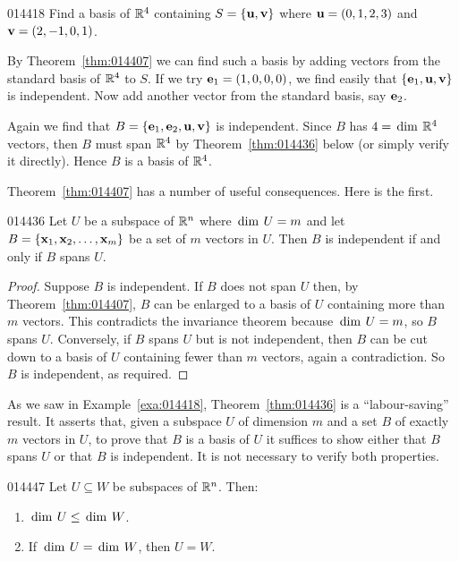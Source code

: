 \begin{example}{}{014418}
Find a basis of $\mathbb{R}^4$ containing $S = \{\textbf{u}, \textbf{v}\}$ where $\textbf{u} = (0, 1, 2, 3)$ and $\textbf{v} = (2, -1, 0, 1)$.

\begin{solution}
By Theorem~\ref{thm:014407} we can find such a basis by adding vectors from the standard basis of $\mathbb{R}^4$ to $S$. If we try $\textbf{e}_{1} = (1, 0, 0, 0)$, we find easily that $\{\textbf{e}_{1}, \textbf{u}, \textbf{v}\}$ is independent. Now add another vector from the standard basis, say $\textbf{e}_{2}$.

Again we find that $B = \{\textbf{e}_{1}, \textbf{e}_{2}, \textbf{u}, \textbf{v}\}$ is independent. Since $B$ has $4 = \thinspace\operatorname{dim\medspace} \mathbb{R}^4$ vectors, then $B$ must span $\mathbb{R}^4$ by Theorem~\ref{thm:014436} below (or simply verify it directly). Hence $B$ is a basis of $\mathbb{R}^4$.
\end{solution}
\end{example}

\noindent Theorem~\ref{thm:014407} has a number of useful consequences. Here is the first.

\begin{theorem}{}{014436} %
Let $U$ be a subspace of $\mathbb{R}^n$ where $\thinspace\operatorname{dim\medspace} U = m$ and let $B = \{\textbf{x}_{1}, \textbf{x}_{2}, \dots, \textbf{x}_{m}\}$ be a set of $m$ vectors in $U$. Then $B$ is independent if and only if $B$ spans $U$.
\end{theorem}

\begin{proof}
Suppose $B$ is independent. If $B$ does not span $U$ then, by Theorem~\ref{thm:014407}, $B$ can be enlarged to a basis of $U$ containing more than $m$ vectors. This contradicts the invariance theorem because $\thinspace\operatorname{dim\medspace} U = m$, so $B$ spans $U$. Conversely, if $B$ spans $U$ but is not independent, then $B$ can be cut down to a basis of $U$ containing fewer than $m$ vectors, again a contradiction. So $B$ is independent, as required.
\end{proof}

As we saw in Example~\ref{exa:014418}, Theorem~\ref{thm:014436} is a ``labour-saving'' result. It asserts that, given a subspace $U$ of dimension $m$ and a set $B$ of exactly $m$ vectors in $U$, to prove that $B$ is a basis of $U$ it suffices to show either that $B$ spans $U$ or that $B$ is independent. It is not necessary to verify both properties.

\begin{theorem}{}{014447} %
Let $U \subseteq W$ be subspaces of $\mathbb{R}^n$. Then:

\begin{enumerate}
\item $\thinspace\operatorname{dim\medspace} U \leq \thinspace\operatorname{dim\medspace} W$.

\item If $\thinspace\operatorname{dim\medspace} U = \thinspace\operatorname{dim\medspace} W$, then $U = W$.

\end{enumerate}
\end{theorem}

